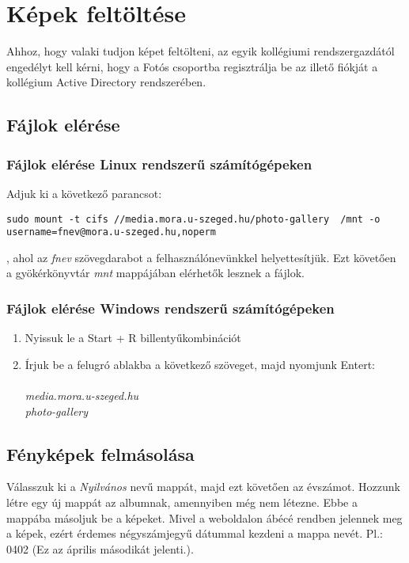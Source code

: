 ﻿\documentclass[12pt]{article}
\begin{document}
\section{Képek feltöltése}
Ahhoz, hogy valaki tudjon képet feltölteni, az egyik kollégiumi rendszergazdától engedélyt kell kérni, hogy a Fotós csoportba regisztrálja be az illető fiókját a kollégium Active Directory rendszerében.

\subsection{Fájlok elérése}
\subsubsection{Fájlok elérése Linux rendszerű számítógépeken}
Adjuk ki a következő parancsot:
\begin{lstlisting}
sudo mount -t cifs //media.mora.u-szeged.hu/photo-gallery  /mnt -o username=fnev@mora.u-szeged.hu,noperm
\end{lstlisting}
, ahol az \textit{fnev} szövegdarabot a felhasználónevünkkel helyettesítjük. Ezt követően a gyökérkönyvtár \textit{mnt} mappájában elérhetők lesznek a fájlok.

\subsubsection{Fájlok elérése Windows rendszerű számítógépeken}
\begin{enumerate}
\item Nyissuk le a Start + R billentyűkombinációt
\item Írjuk be a felugró ablakba a következő szöveget, majd nyomjunk Entert: \textit{\\\\media.mora.u-szeged.hu\\photo-gallery}
\end{enumerate}

\subsection{Fényképek felmásolása}
Válasszuk ki a \textit{Nyilvános} nevű mappát, majd ezt követően az évszámot. Hozzunk létre egy új mappát az albumnak, amennyiben még nem létezne. Ebbe a mappába másoljuk be a képeket. Mivel a weboldalon ábécé rendben jelennek meg a képek, ezért érdemes négyszámjegyű dátummal kezdeni a mappa nevét. Pl.: 0402 (Ez az április másodikát jelenti.).
\end{document}

